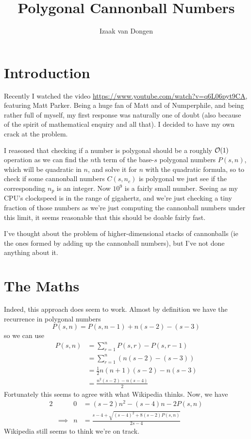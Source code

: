 \documentclass[fleqn,a4paper,11pt]{article}
\title{Polygonal Cannonball Numbers}
\author{Izaak van Dongen}
\begin{document}
\maketitle\thispagestyle{empty} %
\tableofcontents

\section{Introduction}

Recently I watched the video \url{https://www.youtube.com/watch?v=q6L06pyt9CA},
featuring Matt Parker.  Being a huge fan of Matt and of Numperphile, and being
rather full of myself, my first response was naturally one of doubt (also
because of the spirit of mathematical enquiry and all that). I decided to have
my own crack at the problem.

I reasoned that checking if a number is polygonal should be a roughly
\(\operatorname{\mathcal O}(1)\) operation as we can find the \(n\)th term of the base-\(s\)
polygonal numbers \(P(s, n)\), which will be quadratic in \(n\), and solve it
for \(n\) with the quadratic formula, so to check if some cannonball numbers
\(C(s, n_c)\) is polygonal we just see if the corresponding \(n_p\) is an
integer. Now \(10^9\) is a fairly small number. Seeing as my CPU's clockspeed is
in the range of gigahertz, and we're just checking a tiny fraction of those
numbers as we're just computing the cannonball numbers under this limit, it
seems reasonable that this should be doable fairly fast.

I've thought about the problem of higher-dimensional stacks of cannonballs (ie
the ones formed by adding up the cannonball numbers), but I've not done anything
about it.

\section{The Maths}

Indeed, this approach does seem to work. Almost by definition we have the
recurrence in polygonal numbers
\begin{equation*}
P(s, n) = P(s, n - 1) + n(s - 2) - (s - 3)
\end{equation*}
so we can use
\begin{align*}
P(s, n) &= \sum_{r = 1}^n P(s, r) - P(s, r - 1) \\
    &= \sum_{r = 1}^n (n(s - 2) - (s - 3)) \\
    &= \frac 12 n(n + 1)(s - 2) - n(s - 3) \\
    &= \frac{n^2(s - 2) - n(s - 4)} 2
\end{align*}
Fortunately this seems to agree with what Wikipedia thinks. Now, we have
\begin{alignat*}{2}
&& 0 &= (s - 2)n^2 - (s - 4)n - 2P(s, n) \\
&\implies& n &= \frac{s - 4 + \sqrt{(s - 4)^2 + 8(s - 2)P(s, n)}}{2s - 4}
\end{alignat*}
Wikipedia still seems to think we're on track.
\end{document}
